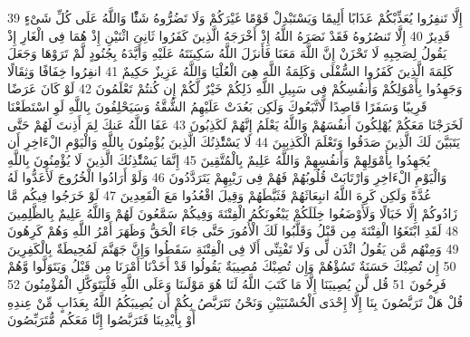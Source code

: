 \documentclass[20pt,a4paper]{article}
\begin{document}
{\tiny\colorbox{cl_aya}{39}} إِلَّا تَنفِرُوا يُعَذِّبْكُمْ عَذَابًا أَلِيمًا وَيَسْتَبْدِلْ قَوْمًا غَيْرَكُمْ وَلَا تَضُرُّوهُ شَئًْا وَاللَّهُ عَلَى كُلِّ شَىْءٍ قَدِيرٌ
{\tiny\colorbox{cl_aya}{40}} إِلَّا تَنصُرُوهُ فَقَدْ نَصَرَهُ اللَّهُ إِذْ أَخْرَجَهُ الَّذِينَ كَفَرُوا ثَانِىَ اثْنَيْنِ إِذْ هُمَا فِى الْغَارِ إِذْ يَقُولُ لِصَحِبِهِ لَا تَحْزَنْ إِنَّ اللَّهَ مَعَنَا فَأَنزَلَ اللَّهُ سَكِينَتَهُ عَلَيْهِ وَأَيَّدَهُ بِجُنُودٍ لَّمْ تَرَوْهَا وَجَعَلَ كَلِمَةَ الَّذِينَ كَفَرُوا السُّفْلَى وَكَلِمَةُ اللَّهِ هِىَ الْعُلْيَا وَاللَّهُ عَزِيزٌ حَكِيمٌ
{\tiny\colorbox{cl_aya}{41}} انفِرُوا خِفَافًا وَثِقَالًا وَجَهِدُوا بِأَمْوَلِكُمْ وَأَنفُسِكُمْ فِى سَبِيلِ اللَّهِ ذَلِكُمْ خَيْرٌ لَّكُمْ إِن كُنتُمْ تَعْلَمُونَ
{\tiny\colorbox{cl_aya}{42}} لَوْ كَانَ عَرَضًا قَرِيبًا وَسَفَرًا قَاصِدًا لَّاتَّبَعُوكَ وَلَكِن بَعُدَتْ عَلَيْهِمُ الشُّقَّةُ وَسَيَحْلِفُونَ بِاللَّهِ لَوِ اسْتَطَعْنَا لَخَرَجْنَا مَعَكُمْ يُهْلِكُونَ أَنفُسَهُمْ وَاللَّهُ يَعْلَمُ إِنَّهُمْ لَكَذِبُونَ
{\tiny\colorbox{cl_aya}{43}} عَفَا اللَّهُ عَنكَ لِمَ أَذِنتَ لَهُمْ حَتَّى يَتَبَيَّنَ لَكَ الَّذِينَ صَدَقُوا وَتَعْلَمَ الْكَذِبِينَ
{\tiny\colorbox{cl_aya}{44}} لَا يَسْتَْٔذِنُكَ الَّذِينَ يُؤْمِنُونَ بِاللَّهِ وَالْيَوْمِ الْءَاخِرِ أَن يُجَهِدُوا بِأَمْوَلِهِمْ وَأَنفُسِهِمْ وَاللَّهُ عَلِيمٌ بِالْمُتَّقِينَ
{\tiny\colorbox{cl_aya}{45}} إِنَّمَا يَسْتَْٔذِنُكَ الَّذِينَ لَا يُؤْمِنُونَ بِاللَّهِ وَالْيَوْمِ الْءَاخِرِ وَارْتَابَتْ قُلُوبُهُمْ فَهُمْ فِى رَيْبِهِمْ يَتَرَدَّدُونَ
{\tiny\colorbox{cl_aya}{46}} وَلَوْ أَرَادُوا الْخُرُوجَ لَأَعَدُّوا لَهُ عُدَّةً وَلَكِن كَرِهَ اللَّهُ انبِعَاثَهُمْ فَثَبَّطَهُمْ وَقِيلَ اقْعُدُوا مَعَ الْقَعِدِينَ
{\tiny\colorbox{cl_aya}{47}} لَوْ خَرَجُوا فِيكُم مَّا زَادُوكُمْ إِلَّا خَبَالًا وَلَأَوْضَعُوا خِلَلَكُمْ يَبْغُونَكُمُ الْفِتْنَةَ وَفِيكُمْ سَمَّعُونَ لَهُمْ وَاللَّهُ عَلِيمٌ بِالظَّلِمِينَ
{\tiny\colorbox{cl_aya}{48}} لَقَدِ ابْتَغَوُا الْفِتْنَةَ مِن قَبْلُ وَقَلَّبُوا لَكَ الْأُمُورَ حَتَّى جَاءَ الْحَقُّ وَظَهَرَ أَمْرُ اللَّهِ وَهُمْ كَرِهُونَ
{\tiny\colorbox{cl_aya}{49}} وَمِنْهُم مَّن يَقُولُ ائْذَن لِّى وَلَا تَفْتِنِّى أَلَا فِى الْفِتْنَةِ سَقَطُوا وَإِنَّ جَهَنَّمَ لَمُحِيطَةٌ بِالْكَفِرِينَ
{\tiny\colorbox{cl_aya}{50}} إِن تُصِبْكَ حَسَنَةٌ تَسُؤْهُمْ وَإِن تُصِبْكَ مُصِيبَةٌ يَقُولُوا قَدْ أَخَذْنَا أَمْرَنَا مِن قَبْلُ وَيَتَوَلَّوا وَّهُمْ فَرِحُونَ
{\tiny\colorbox{cl_aya}{51}} قُل لَّن يُصِيبَنَا إِلَّا مَا كَتَبَ اللَّهُ لَنَا هُوَ مَوْلَىنَا وَعَلَى اللَّهِ فَلْيَتَوَكَّلِ الْمُؤْمِنُونَ
{\tiny\colorbox{cl_aya}{52}} قُلْ هَلْ تَرَبَّصُونَ بِنَا إِلَّا إِحْدَى الْحُسْنَيَيْنِ وَنَحْنُ نَتَرَبَّصُ بِكُمْ أَن يُصِيبَكُمُ اللَّهُ بِعَذَابٍ مِّنْ عِندِهِ أَوْ بِأَيْدِينَا فَتَرَبَّصُوا إِنَّا مَعَكُم مُّتَرَبِّصُونَ
\end{document}
